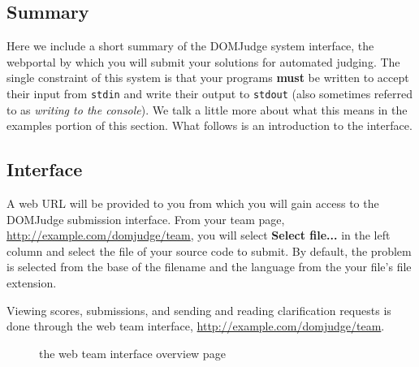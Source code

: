\documentclass[a4paper]{article}
\begin{document}
\subsection{Summary}
Here we include a short summary of the DOMJudge system interface, the webportal by which you will submit your solutions for automated judging. The single constraint of this system is that your programs \textbf{must} be written to accept their input from \texttt{stdin} and write their output to \texttt{stdout} (also sometimes referred to as \textit{writing to the console}). We talk a little more about what this means in the examples portion of this section. What follows is an introduction to the interface.

\subsection{Interface}
A web URL will be provided to you from which you will gain access to the DOMJudge submission interface. From your team page, \url{http://example.com/domjudge/team}, you will select \textbf{Select file...} in the left column and select the file of your source code to submit. By default, the problem is selected from the base of the filename and the language from the your file's file extension. 

Viewing scores, submissions, and sending and reading clarification requests is done through the web team interface, \url{http://example.com/domjudge/team}. 

\begin{figure}[p]
    \centering
    \caption{the web team interface overview page}
    \label{fig:team-overview}
\end{figure}
\end{document}
